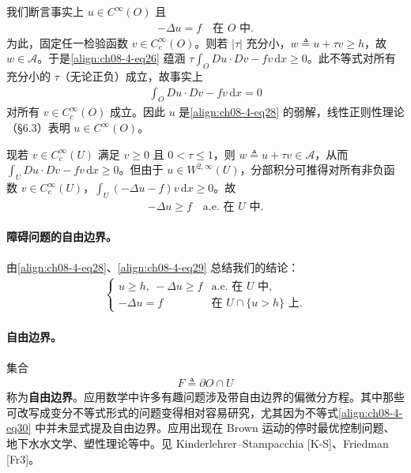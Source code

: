 \documentclass[../../main.tex]{subfiles}
\begin{document}
我们断言事实上 $u\in C^\infty(O)$ 且
\begin{align}
-\Delta u=f\quad\text{在 }O\text{ 中}.\label{align:ch08-4-eq28}
\end{align}
为此，固定任一检验函数 $v\in C_c^\infty(O)$。则若 $|\tau|$ 充分小，$w\triangleq u+\tau v\geqslant h$，故 $w\in\mathcal{A}$。于是\eqref{align:ch08-4-eq26} 蕴涵 $\tau\int_O Du\cdot Dv-fv\,\mathrm{d}x\geqslant 0$。此不等式对所有充分小的 $\tau$（无论正负）成立，故事实上
\begin{align*}
\int_O Du\cdot Dv-fv\,\mathrm{d}x=0
\end{align*}
对所有 $v\in C_c^\infty(O)$ 成立。因此 $u$ 是\eqref{align:ch08-4-eq28} 的弱解，线性正则性理论（\S6.3）表明 $u\in C^\infty(O)$。

现若 $v\in C_c^\infty(U)$ 满足 $v\geqslant 0$ 且 $0<\tau\leqslant 1$，则 $w\triangleq u+\tau v\in\mathcal{A}$，从而 $\int_U Du\cdot Dv-fv\,\mathrm{d}x\geqslant 0$。但由于 $u\in W^{2,\infty}(U)$，分部积分可推得对所有非负函数 $v\in C_c^\infty(U)$，$\int_U(-\Delta u-f)v\,\mathrm{d}x\geqslant 0$。故
\begin{align}
-\Delta u\geqslant f\quad\text{a.e. 在 }U\text{ 中}.\label{align:ch08-4-eq29}
\end{align}

\paragraph{障碍问题的自由边界。}由\eqref{align:ch08-4-eq28}、\eqref{align:ch08-4-eq29} 总结我们的结论：
\begin{align}
\begin{cases}
u\geqslant h,\ -\Delta u\geqslant f&\text{a.e. 在 }U\text{ 中},\\
-\Delta u=f&\text{在 }U\cap\{u>h\}\text{ 上}.
\end{cases}\label{align:ch08-4-eq30}
\end{align}
\paragraph{自由边界。}集合
\begin{align*}
F\triangleq\partial O\cap U
\end{align*}
称为\textbf{自由边界}。应用数学中许多有趣问题涉及带自由边界的偏微分方程。其中那些可改写成变分不等式形式的问题变得相对容易研究，尤其因为不等式\eqref{align:ch08-4-eq30} 中并未显式提及自由边界。应用出现在 Brown 运动的停时最优控制问题、地下水水文学、塑性理论等中。见 Kinderlehrer--Stampacchia [K-S]、Friedman [Fr3]。
\end{document}
